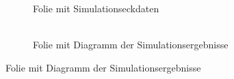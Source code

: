 \begin{figure}[th]
	\centering
	\begin{subfigure}{0.48\textwidth}
		\centering
		\caption{Folie mit Simulationseckdaten\\ \textcolor{white}{x}}
		\label{abb:folie_simulation_f1}
	\end{subfigure}
	\quad
	\begin{subfigure}{0.48\textwidth}
		\centering
		\caption{Folie mit Diagramm der Simulationsergebnisse}
		\label{abb:folie_simulation_f2}
	\end{subfigure}

\end{figure}
